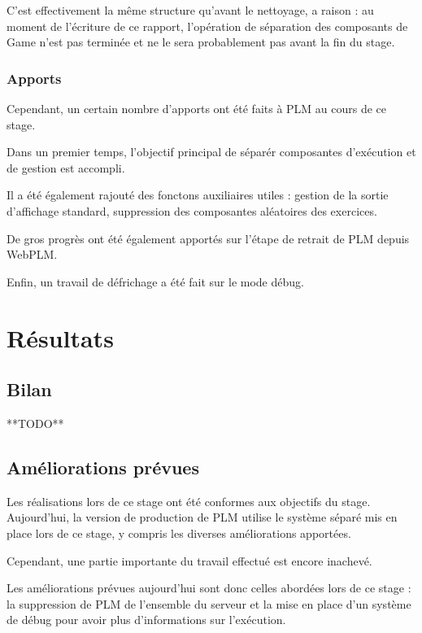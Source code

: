 \documentclass[stage]{tnreport}
\begin{document}
C'est effectivement la même structure qu'avant le nettoyage, a raison : au moment de l'écriture de ce rapport, l'opération de séparation des composants de Game n'est pas terminée et ne le sera probablement pas avant la fin du stage.

 \subsection{Apports}

Cependant, un certain nombre d'apports ont été faits à PLM au cours de ce stage.

Dans un premier temps, l'objectif principal de séparér composantes d'exécution et de gestion est accompli.

Il a été également rajouté des fonctons auxiliaires utiles : gestion de la sortie d'affichage standard, suppression des composantes aléatoires des exercices.

De gros progrès ont été également apportés sur l'étape de retrait de PLM depuis WebPLM.

Enfin, un travail de défrichage a été fait sur le mode débug.

\cleardoublepage 

\chapter{Résultats}

\section{Bilan}

**TODO**

\section{Améliorations prévues}

Les réalisations lors de ce stage ont été conformes aux objectifs du stage. Aujourd'hui, la version de production de PLM utilise le système séparé mis en place lors de ce stage, y compris les diverses améliorations apportées.

Cependant, une partie importante du travail effectué est encore inachevé.

Les améliorations prévues aujourd'hui sont donc celles abordées lors de ce stage : la suppression de PLM de l'ensemble du serveur et la mise en place d'un système de débug pour avoir plus d'informations sur l'exécution.
\end{document}
